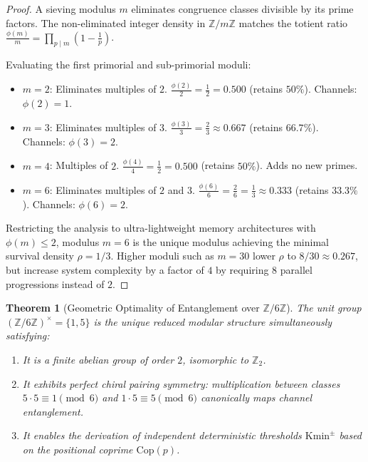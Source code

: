 \documentclass{article}
\numberwithin{equation}{section}
\theoremstyle{plain}
\newtheorem{theorem}{Theorem}[section]
\theoremstyle{definition}
\begin{document}
\begin{proof}
A sieving modulus $m$ eliminates congruence classes divisible by its prime factors. The non-eliminated integer density in $\mathbb{Z}/m\mathbb{Z}$ matches the totient ratio $\frac{\phi(m)}{m} = \prod_{p \mid m} \left(1 - \frac{1}{p}\right)$.

Evaluating the first primorial and sub-primorial moduli:
\begin{itemize}
    \item $m=2$: Eliminates multiples of $2$. $\frac{\phi(2)}{2} = \frac{1}{2} = 0.500$ (retains $50\%$). Channels: $\phi(2)=1$.
    \item $m=3$: Eliminates multiples of $3$. $\frac{\phi(3)}{3} = \frac{2}{3} \approx 0.667$ (retains $66.7\%$). Channels: $\phi(3)=2$.
    \item $m=4$: Multiples of $2$. $\frac{\phi(4)}{4} = \frac{1}{2} = 0.500$ (retains $50\%$). Adds no new primes.
    \item $m=6$: Eliminates multiples of $2$ and $3$. $\frac{\phi(6)}{6} = \frac{2}{6} = \frac{1}{3} \approx 0.333$ (retains $33.3\%$). Channels: $\phi(6)=2$.
\end{itemize}
Restricting the analysis to ultra-lightweight memory architectures with $\phi(m) \le 2$, modulus $m = 6$ is the unique modulus achieving the minimal survival density $\rho = 1/3$. Higher moduli such as $m = 30$ lower $\rho$ to $8/30 \approx 0.267$, but increase system complexity by a factor of $4$ by requiring $8$ parallel progressions instead of $2$.
\end{proof}

\begin{theorem}[Geometric Optimality of Entanglement over $\mathbb{Z}/6\mathbb{Z}$]
\label{thm:optimalidad-entrelazamiento-Z6}
The unit group $(\mathbb{Z}/6\mathbb{Z})^\times = \{1, 5\}$ is the unique reduced modular structure simultaneously satisfying:
\begin{enumerate}
    \item It is a finite abelian group of order $2$, isomorphic to $\mathbb{Z}_2$.
    \item It exhibits perfect chiral pairing symmetry: multiplication between classes $5 \cdot 5 \equiv 1 \pmod 6$ and $1 \cdot 5 \equiv 5 \pmod 6$ canonically maps channel entanglement.
    \item It enables the derivation of independent deterministic thresholds $\mathrm{Kmin}^\pm$ based on the positional coprime $\mathrm{Cop}(p)$.
\end{enumerate}
\end{theorem}
\end{document}

